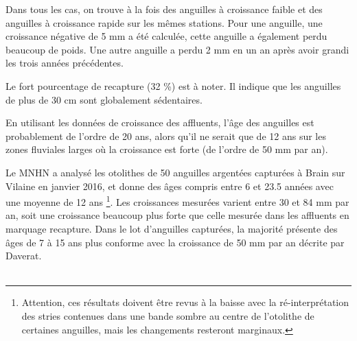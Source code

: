 \documentclass[10pt,twocolumn,titlepage,twoside]{article}\usepackage[]{graphicx}\usepackage[]{color}
\begin{document}
Dans tous les cas,  on
trouve à la fois des anguilles à croissance faible et des anguilles à croissance
rapide sur les mêmes stations. Pour une anguille, une croissance négative de 5
mm a été calculée, cette anguille a également perdu beaucoup de poids. Une autre
anguille a perdu 2 mm en un an après avoir grandi les trois années précédentes.

Le fort pourcentage de recapture (32 \%) est à noter.
Il indique que les anguilles de plus de 30 cm sont globalement
sédentaires.

En utilisant les données de croissance des affluents, l'âge des anguilles est
probablement de l'ordre de 20 ans, alors qu'il ne serait que de 12 ans sur les
zones fluviales larges où la croissance est forte (de l'ordre de 50 mm par an). 

Le MNHN a analysé les otolithes de 50 anguilles argentées capturées à
Brain sur Vilaine en janvier 2016, et donne des âges compris entre 6 et 23.5
années avec une moyenne de 12 ans \footnote{Attention, ces résultats doivent être revus à la baisse avec
la ré-interprétation des stries contenues dans une bande sombre au centre de l'otolithe de certaines anguilles, mais les changements resteront marginaux.}. Les croissances mesurées varient entre 30 et 84
mm par an, soit une croissance beaucoup plus forte que celle mesurée dans les
affluents en marquage recapture. Dans le lot d'anguilles capturées, la majorité
présente des âges de 7 à 15 ans plus conforme avec la croissance de 50 mm par an
décrite par Daverat.\\ 

 \\ \mediumskip
\end{document}
